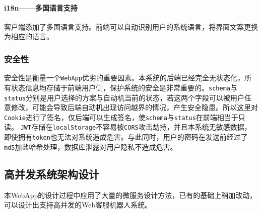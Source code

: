 \documentclass[hyperref]{ctexart}
\begin{document}
\paragraph{i18n——多国语言支持} 客户端添加了多国语言支持。前端可以自动识别用户的系统语言，将界面文案更换为相应的语言。
\subsubsection{安全性}
安全性是衡量一个\texttt{WebApp}优劣的重要因素。本系统的后端已经完全无状态化，所有状态信息均存储于前端用户侧，保护系统的安全是非常重要的。\texttt{schema}与\texttt{status}分别是用户选择的方案与自动机当前的状态，若这两个字段可以被用户任意修改，可能会导致后端自动机出现访问越界的情况，产生安全隐患。所以这里对\texttt{Cookie}进行了签名，仅后端可以生成签名，使\texttt{schema}与\texttt{status}在前端相当于只读。
\texttt{JWT}存储在\texttt{localStorage}不容易被\texttt{CORS}攻击劫持，并且本系统无敏感数据，即使拥有\texttt{token}也无法对系统造成危害。与此同时，用户的密码在发送前经过了\texttt{md5}加盐哈希处理，数据库泄露对用户隐私不造成危害。
\subsection{高并发系统架构设计}
本WebApp的设计过程中应用了大量的微服务设计方法，已有的基础上稍加改动，可以设计出支持高并发的Web客服机器人系统。
\end{document}
